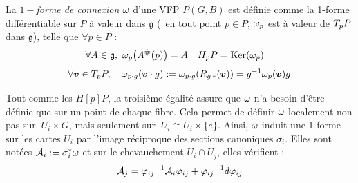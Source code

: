 \begin{definition} \label{def:1-form2conn}
	La \emph{$1-$forme de connexion} $\conn$ d'une VFP $P(G,B)$ est définie comme la 1-forme différentiable sur $P$ à valeur dans $\mathfrak{g}$ (\ie~en tout point $p\in P$, $\conn_p$ est à valeur de $\tg[p]{P}$ dans $\mathfrak{g}$), telle que $\forall p\in P$ :
	\begin{align} \label{eq:1-form2conn}
		\forall A\in \mathfrak{g},\ \conn_p\big(A^\#(p)\big) &= A  &  \hg[p]{P} &= \Ker(\conn_p)
	\end{align}
	\begin{equation} \label{eq:1-form_G-inv}
		\forall \bf{v}\in\tg[p]{P},\quad \conn_{p\cdot g}(\bf{v}\cdot g) \defeq \conn_{p\cdot g}(R_{g\, *}(\bf{v})) = g^{-1}\conn_p(\bf{v})g
	\end{equation}
	\skipl
	
	Tout comme les $H[p]{P}$, la troisième égalité assure que $\conn$ n'a besoin d'être définie que sur un point de chaque fibre. Cela permet de définir $\conn$ localement non pas sur $\ U_i\times G$, mais seulement sur $\ U_i \cong U_i \times \{e\}$. Ainsi, $\conn$ induit une 1-forme sur les cartes $U_i$ par l'image réciproque des sections canoniques $\sigma_i$. Elles sont notées $\locconn_i \defeq \sigma_i^*\conn$ et sur le chevauchement $U_i\cap U_j$, elles vérifient :
	\begin{equation}\label{eq:conn_local}
		\locconn_j = {\varphi_{ij}}^{-1} \locconn_i \varphi_{ij} + {\varphi_{ij}}^{-1} d \varphi_{ij}
	\end{equation}
\end{definition}
\skipl


